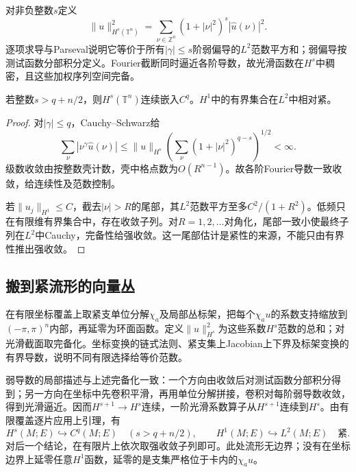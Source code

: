 对非负整数$s$定义
\[
 \|u\|_{H^s(\mathbb T^n)}^2
 =\sum_{\nu\in\mathbb Z^n}(1+|\nu|^2)^s|\widehat u(\nu)|^2.
\]
逐项求导与Parseval说明它等价于所有$|\gamma|\leq s$阶弱偏导的$L^2$范数平方和；弱偏导按测试函数分部积分定义。Fourier截断同时逼近各阶导数，故光滑函数在$H^s$中稠密，且这些加权序列空间完备。

\begin{lemma}[Sobolev连续性与Rellich紧性]\label{lem:sobolev-rellich}
若整数$s>q+n/2$，则$H^s(\mathbb T^n)$连续嵌入$C^q$。$H^1$中的有界集合在$L^2$中相对紧。
\end{lemma}
\begin{proof}
对$|\gamma|\leq q$，Cauchy--Schwarz给
\[
 \sum_\nu |\nu^\gamma\widehat u(\nu)|
 \leq\|u\|_{H^s}
 \left(\sum_\nu(1+|\nu|^2)^{q-s}\right)^{1/2}<\infty.
\]
级数收敛由按整数壳计数，壳中格点数为$O(R^{n-1})$。故各阶Fourier导数一致收敛，给连续性及范数控制。

若$\|u_j\|_{H^1}\leq C$，截去$|\nu|>R$的尾部，其$L^2$范数平方至多$C^2/(1+R^2)$。低频只在有限维有界集合中，存在收敛子列。对$R=1,2,\ldots$对角化，尾部一致小使最终子列在$L^2$中Cauchy，完备性给强收敛。这一尾部估计是紧性的来源，不能只由有界性推出强收敛。
\end{proof}

\subsection*{搬到紧流形的向量丛}
在有限坐标覆盖上取紧支单位分解$\chi_a$及局部丛标架，把每个$\chi_au$的系数支持缩放到$(-\pi,\pi)^n$内部，再延零为环面函数。定义$\|u\|_{H^s}^2$为这些系数$H^s$范数的总和；对光滑截面取完备化。坐标变换的链式法则、紧支集上Jacobian上下界及标架变换的有界导数，说明不同有限选择给等价范数。

弱导数的局部描述与上述完备化一致：一个方向由收敛后对测试函数分部积分得到；另一方向在坐标中先卷积平滑，再用单位分解拼接，卷积对每阶弱导数收敛，得到光滑逼近。因而$H^{s+1}\to H^s$连续，一阶光滑系数算子从$H^{s+1}$连续到$H^s$。由有限覆盖逐片应用上引理，有
\[
 H^s(M;E)\hookrightarrow C^q(M;E)\quad(s>q+n/2),
 \qquad H^1(M;E)\hookrightarrow L^2(M;E)\quad\text{紧}.
\]
对后一个结论，在有限片上依次取强收敛子列即可。此处流形无边界；没有在坐标边界上延零任意$H^1$函数，延零的是支集严格位于卡内的$\chi_au$。
